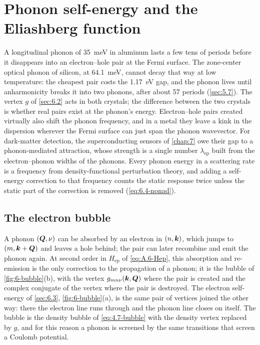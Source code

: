 \section{Phonon self-energy and the Eliashberg function}\label{sec:6.4}

A longitudinal phonon of \SI{35}{meV} in aluminum lasts a few tens of periods before it disappears into an electron--hole pair at the Fermi surface. The zone-center optical phonon of silicon, at \SI{64.1}{meV}, cannot decay that way at low temperature: the cheapest pair costs the \SI{1.17}{eV} gap, and the phonon lives until anharmonicity breaks it into two phonons, after about 57 periods (\cref{sec:5.7}). The vertex $g$ of \cref{sec:6.2} acts in both crystals; the difference between the two crystals is whether real pairs exist at the phonon's energy. Electron--hole pairs created virtually also shift the phonon frequency, and in a metal they leave a kink in the dispersion wherever the Fermi surface can just span the phonon wavevector. For dark-matter detection, the superconducting sensors of \cref{chap:7} owe their gap to a phonon-mediated attraction, whose strength is a single number $\lambda_{\mathrm{ep}}$ built from the electron--phonon widths of the phonons. Every phonon energy in a scattering rate is a frequency from density-functional perturbation theory, and adding a self-energy correction to that frequency counts the static response twice unless the static part of the correction is removed (\cref{eq:6.4-nonad}).

\subsection{The electron bubble}

A phonon $(\bm{Q},\nu)$ can be absorbed by an electron in $(n,\bm{k})$, which jumps to $(m,\bm{k}+\bm{Q})$ and leaves a hole behind; the pair can later recombine and emit the phonon again. At second order in $H_{\mathrm{ep}}$ of \cref{eq:A.6-Hep}, this absorption and re-emission is the only correction to the propagation of a phonon; it is the bubble of \cref{fig:6-bubble}(b), with the vertex $g_{mn\nu}(\bm{k},\bm{Q})$ where the pair is created and the complex conjugate of the vertex where the pair is destroyed. The electron self-energy of \cref{sec:6.3}, \cref{fig:6-bubble}(a), is the same pair of vertices joined the other way: there the electron line runs through and the phonon line closes on itself. The bubble is the density bubble of \cref{eq:4.7-bubble} with the density vertex replaced by $g$, and for this reason a phonon is screened by the same transitions that screen a Coulomb potential.

